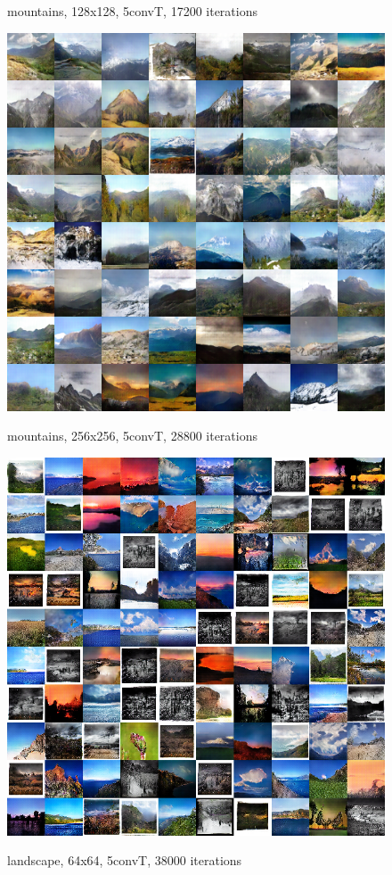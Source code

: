 \documentclass{article}
\begin{document}
\begin{CJK*}{UTF8}{gbsn}
\begin{figure}[htbp]
\begin{minipage}{0.5\linewidth}
			\caption{mountains, 128x128, 5convT, 17200 iterations}
		\end{minipage}
		\begin{minipage}{0.5\linewidth}
			\label{m3}
			\centering\includegraphics[scale=0.35]{res/mountain-256-5conv-28800.png}
			\caption{mountains, 256x256, 5convT, 28800 iterations}
		\end{minipage}
		\begin{minipage}{0.5\linewidth}
			\label{l1}
			\centering\includegraphics[scale=0.3]{res/selected.png}
			\caption{landscape, 64x64, 5convT, 38000 iterations}
		\end{minipage}
	\end{figure}


\end{CJK*}
\end{document}
